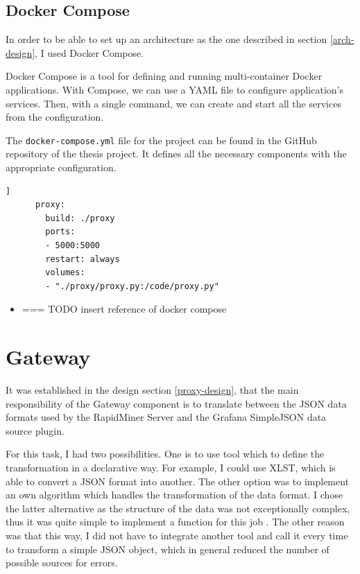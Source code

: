 \subsection{Docker Compose}

In order to be able to set up an architecture as the one described in section \ref{arch-design}, I used Docker Compose.


Docker Compose is a tool for defining and running multi-container Docker applications. With Compose, we can use a YAML file to configure application’s services. Then, with a single command, we can create and start all the services from the configuration.

The \texttt{docker-compose.yml} file for the project can be found in the GitHub repository of the thesis project. It defines all the necessary components with the appropriate configuration.

\begin{minipage}{\linewidth}
	\begin{lstlisting}[language=docker-compose-proxy, caption={Extract of the \texttt{docker-compose.yml}}, label={lst:proxy-docker-compose}]]	
	  proxy:
	    build: ./proxy
	    ports:
	    - 5000:5000
	    restart: always
	    volumes: 
	    - "./proxy/proxy.py:/code/proxy.py"
	\end{lstlisting}
\end{minipage}

\begin{center}
	\begin{itemize}
		\item === TODO insert reference of docker compose
	\end{itemize}
\end{center}

\section{Gateway} \label{proxy-impl}

It was established in the design section \ref{proxy-design}, that the main responsibility of the Gateway component is to translate between the JSON data formats used by the RapidMiner Server and the Grafana SimpleJSON data source plugin.

For this task, I had two possibilities. One is to use tool which to define the transformation in a declarative way. For example, I could use XLST, which is able to convert a JSON format into another. The other option was to implement an own algorithm which handles the transformation of the data format. I chose the latter alternative as the structure of the data was not exceptionally complex, thus it was quite simple to implement a function for this job . The other reason was that this way, I did not have to integrate another tool and call it every time to transform a simple JSON object, which in general reduced the number of possible sources for errors.


